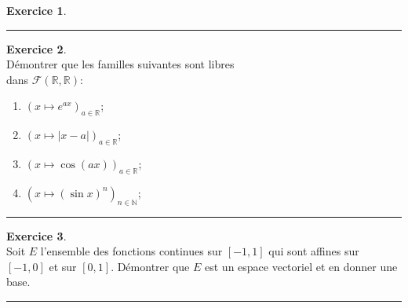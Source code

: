 \documentclass[a4paper,10pt]{article}
\theoremstyle{definition}
\theoremstyle{definition}
\newtheorem{exo}{Exercice}
\newcommand{\R}{\mathbb{R}}
\newcommand{\N}{\mathbb{N}}
\begin{document}
\begin{minipage}{1\linewidth}
\begin{minipage}[t]{0.48\linewidth}
\begin{exo}
	\centering
	\rule{1\linewidth}{0.6pt}
	\end{exo}

		\begin{exo}\quad\\
			Démontrer que les familles suivantes sont libres\\ dans $\mathcal{F}(\R,\R)$:\\[0.25cm]
			\begin{enumerate}
				\item $\left(x\longmapsto e^{ax}\right)_{a\in\R}$;\\[0.25cm]
				\item $\left(x\longmapsto |x-a|\right)_{a\in\R}$;\\[0.25cm]
				\item $\left(x\longmapsto \cos(ax)\right)_{a\in\R}$;\\[0.25cm]
				\item $\left(x\longmapsto (\sin x)^n\right)_{n\in\N}$;\\[0.25cm]
			\end{enumerate} 
		
		\centering
		\rule{1\linewidth}{0.6pt}
	\end{exo}
	
		
	
	\end{minipage}	
	\hfill\vrule\hfill
	\begin{minipage}[t]{0.48\linewidth}
		\raggedright
		
	\begin{exo}\quad\\
		Soit $E$ l'ensemble des fonctions continues sur $[-1,1]$ qui sont affines sur $[-1,0]$ et sur $[0,1]$. Démontrer que $E$ est un espace vectoriel et en donner une base.
		
		\centering
		\rule{1\linewidth}{0.6pt}
	\end{exo}
		

\end{minipage}
\end{minipage}
\end{document}
